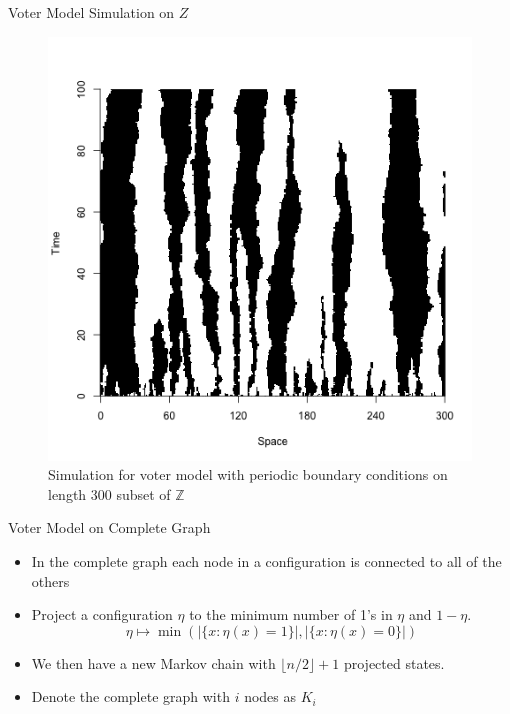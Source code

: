 \documentclass{beamer}
\theoremstyle{definition}
\newcommand{\Z}{\mathbb{Z}}
\begin{document}
\begin{frame}{Voter Model Simulation on $Z$}
\begin{figure}[H]
  \centering
    \includegraphics[width=.6\textwidth]{figures/voter_simulation_1d_300.png}
   \caption{Simulation for voter model with periodic boundary conditions on length 300 subset of $\Z$}
  \label{fig:voter_sim_1d_torus.png}
\end{figure}
\end{frame}


\begin{frame}{Voter Model on Complete Graph}
    \begin{itemize}
        \item In the complete graph each node in a configuration is connected to all of the others
        \item Project a configuration $\eta$ to the minimum number of 1's in $\eta$ and $1 - \eta$.
        $$
        \eta \mapsto \min\left(|\{x : \eta(x) = 1\}|, |\{x : \eta(x) = 0\}|  \right)
        $$
        \item We then have a new Markov chain with $\lfloor n/2 \rfloor + 1$ projected states.
        \item Denote the complete graph with $i$ nodes as $K_i$
    \end{itemize}
\end{frame}
\end{document}
